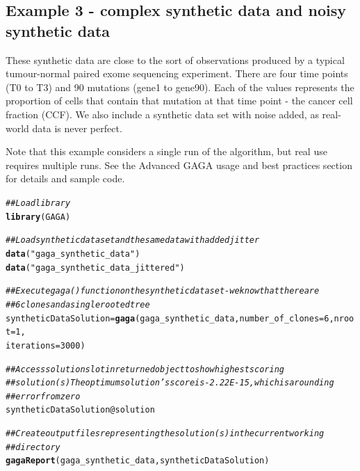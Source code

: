 \documentclass[a4paper]{article}\usepackage[]{graphicx}\usepackage[]{color}
\makeatletter
\newcommand{\hlnum}[1]{\textcolor[rgb]{0.686,0.059,0.569}{#1}}%
\newcommand{\hlstr}[1]{\textcolor[rgb]{0.192,0.494,0.8}{#1}}%
\newcommand{\hlcom}[1]{\textcolor[rgb]{0.678,0.584,0.686}{\textit{#1}}}%
\newcommand{\hlopt}[1]{\textcolor[rgb]{0,0,0}{#1}}%
\newcommand{\hlstd}[1]{\textcolor[rgb]{0.345,0.345,0.345}{#1}}%
\newcommand{\hlkwb}[1]{\textcolor[rgb]{0.69,0.353,0.396}{#1}}%
\newcommand{\hlkwc}[1]{\textcolor[rgb]{0.333,0.667,0.333}{#1}}%
\newcommand{\hlkwd}[1]{\textcolor[rgb]{0.737,0.353,0.396}{\textbf{#1}}}%
\newenvironment{kframe}{%
 \def\at@end@of@kframe{}%
 \ifinner\ifhmode%
  \def\at@end@of@kframe{\end{minipage}}%
  \begin{minipage}{\columnwidth}%
 \fi\fi%
 \def\FrameCommand##1{\hskip\@totalleftmargin \hskip-\fboxsep
 \colorbox{shadecolor}{##1}\hskip-\fboxsep
     \hskip-\linewidth \hskip-\@totalleftmargin \hskip\columnwidth}%
 \MakeFramed {\advance\hsize-\width
   \@totalleftmargin\z@ \linewidth\hsize
   \@setminipage}}%
 {\par\unskip\endMakeFramed%
 \at@end@of@kframe}
\newenvironment{knitrout}{}{} %
\makeatother
\begin{document}
\subsection{Example 3 - complex synthetic data and noisy synthetic data}
These synthetic data are close to the sort of observations produced by a typical tumour-normal paired exome sequencing experiment.  There are four time points (T0 to T3) and 90 mutations (gene1 to gene90).  Each of the values represents the proportion of cells that contain that mutation at that time point - the cancer cell fraction (CCF).  We also include a synthetic data set with noise added, as real-world data is never perfect.

Note that this example considers a single run of the algorithm, but real use requires multiple runs.  See the Advanced GAGA usage and best practices section for details and sample code.

\begin{knitrout}
\color{fgcolor}\begin{kframe}
\begin{alltt}
\hlcom{## Load library}
\hlkwd{library}\hlstd{(GAGA)}

\hlcom{## Load synthetic data set and the same data with added jitter}
\hlkwd{data}\hlstd{(}\hlstr{"gaga_synthetic_data"}\hlstd{)}
\hlkwd{data}\hlstd{(}\hlstr{"gaga_synthetic_data_jittered"}\hlstd{)}

\hlcom{## Execute gaga() function on the synthetic data set - we know that there are}
\hlcom{## 6 clones and a single rooted tree}
\hlstd{syntheticDataSolution} \hlkwb{=} \hlkwd{gaga}\hlstd{(gaga_synthetic_data,} \hlkwc{number_of_clones} \hlstd{=} \hlnum{6}\hlstd{,} \hlkwc{nroot} \hlstd{=} \hlnum{1}\hlstd{,}
    \hlkwc{iterations} \hlstd{=} \hlnum{3000}\hlstd{)}

\hlcom{## Access solution slot in returned object to show highest scoring}
\hlcom{## solution(s) The optimum solution's score is -2.22E-15, which is a rounding}
\hlcom{## error from zero}
\hlstd{syntheticDataSolution}\hlopt{@}\hlkwc{solution}

\hlcom{## Create output files representing the solution(s) in the current working}
\hlcom{## directory}
\hlkwd{gagaReport}\hlstd{(gaga_synthetic_data, syntheticDataSolution)}
\end{alltt}
\end{kframe}
\end{knitrout}
\end{document}
